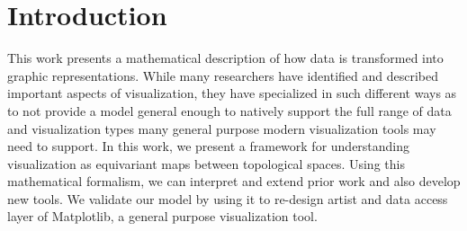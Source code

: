 \documentclass[../main.tex]{subfiles}
\begin{document}
\section{Introduction}
\label{sec:intro}

 This work presents a mathematical description of how data is transformed into graphic representations. While many researchers have identified and described important aspects of visualization, they have specialized in such different ways as to not provide a model general enough to natively support the full range of data and visualization types many general purpose modern visualization tools may need to support. In this work, we present a framework for understanding visualization as equivariant maps between topological spaces. Using this mathematical formalism, we can interpret and extend prior work and also develop new tools. We validate our model by using it to re-design artist and data access layer of Matplotlib, a general purpose visualization tool. 
\end{document}
